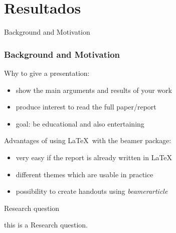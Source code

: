 \section{Resultados}
\begin{frame}{Background and Motivation}
    \frametitle<presentation>{Background and Motivation}
    \begin{block}{Why to give a presentation:}
        \begin{itemize}
            \item show the main arguments and results of your work
            \item produce interest to read the full paper/report
            \item goal: be educational and also entertaining
        \end{itemize}
    \end{block}
    \begin{block}{Advantages of using \LaTeX ~with the beamer package:}
        \begin{itemize}
            \item very easy if the report is already written in \LaTeX
            \item different themes which are usable in practice
            \item possibility to create handouts using \emph{beamerarticle}
        \end{itemize}
    \end{block}
\end{frame}

\begin{frame}{Research question}

    this is a Research question.

\end{frame}
